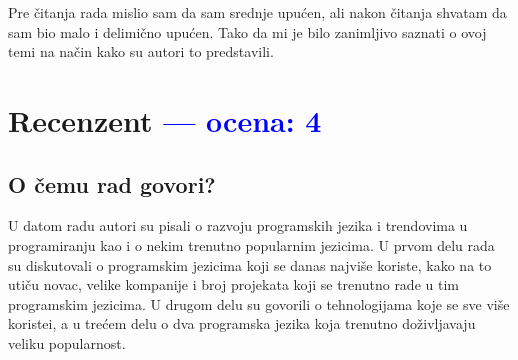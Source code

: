 \documentclass[a4paper]{report}
\newcommand{\odgovor}[1]{\textcolor{blue}{#1}}
\begin{document}
Pre čitanja rada mislio sam da sam srednje upućen, ali nakon čitanja shvatam da sam bio malo i delimično upućen.
Tako da mi je bilo zanimljivo saznati o ovoj temi na način kako su autori to predstavili.


\chapter{Recenzent \odgovor{--- ocena: 4} }


\section{O čemu rad govori?}
U datom radu autori su pisali o razvoju programskih jezika i trendovima u programiranju kao i o nekim trenutno popularnim jezicima. U prvom delu rada su diskutovali o programskim jezicima koji se danas najviše koriste, kako na to utiču novac, velike kompanije i broj projekata koji se trenutno rade u tim programskim jezicima. U drugom delu su govorili o tehnologijama koje se sve više koristei, a u trećem delu o dva programska jezika koja trenutno doživljavaju veliku popularnost.
\end{document}
